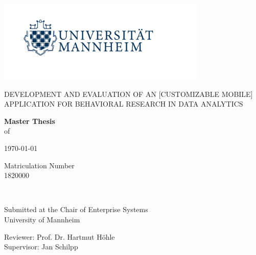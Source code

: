 \begin{titlepage}
	\centering

    \includegraphics[width=10cm]{template/logo_university_of_mannheim_no_bwl.png}\par

	\vspace{1.25cm}
	{\scshape\Large\uppercase{Development and Evaluation of an [Customizable Mobile] Application for Behavioral Research in Data Analytics}\par}
	
	\vspace{3cm}
	{\linespread{1}\normalsize \textbf{Master Thesis}\\
	 of  \par}
	
	{\large {}\par}
	
	\vspace{0.5cm}
	{\small \today \par}
	
	\vspace{0.3cm}
	{\footnotesize  Matriculation Number\\
	1820000\par}
	
	\vspace{2cm}
	\hrulefill\\	
	\vspace{1.0cm}
	{\linespread{1}\normalsize Submitted at the Chair of Enterprise Systems\\
	University of Mannheim\par}
	
	\vspace{0.3cm}
	{\linespread{1}\normalsize  Reviewer: Prof. Dr. Hartmut Höhle\\
	Supervisor: Jan Schilpp\par}


\end{titlepage}
